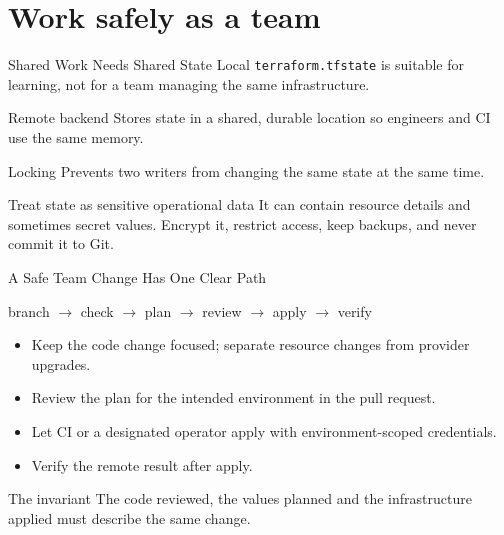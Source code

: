 \documentclass[aspectratio=169, xcolor=table]{beamer}
\begin{document}
\section{Work safely as a team}

\begin{frame}{Shared Work Needs Shared State}
  Local \texttt{terraform.tfstate} is suitable for learning, not for a team managing the
  same infrastructure.

  \vspace{0.6em}
  \begin{block}{Remote backend}
    Stores state in a shared, durable location so engineers and CI use the same memory.
  \end{block}

  \begin{block}{Locking}
    Prevents two writers from changing the same state at the same time.
  \end{block}

  \begin{alertblock}{Treat state as sensitive operational data}
    It can contain resource details and sometimes secret values. Encrypt it, restrict access,
    keep backups, and never commit it to Git.
  \end{alertblock}
\end{frame}

\begin{frame}{A Safe Team Change Has One Clear Path}
  \begin{center}
    branch
    $\longrightarrow$ check
    $\longrightarrow$ plan
    $\longrightarrow$ review
    $\longrightarrow$ apply
    $\longrightarrow$ verify
  \end{center}

  \vspace{0.8em}
  \begin{itemize}
    \item Keep the code change focused; separate resource changes from provider upgrades.
    \item Review the plan for the intended environment in the pull request.
    \item Let CI or a designated operator apply with environment-scoped credentials.
    \item Verify the remote result after apply.
  \end{itemize}

  \begin{block}{The invariant}
    The code reviewed, the values planned and the infrastructure applied must describe the
    same change.
  \end{block}
\end{frame}
\end{document}
